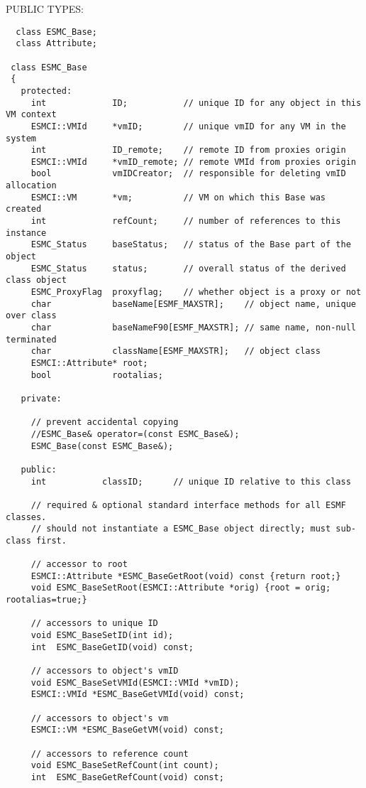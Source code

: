 \begin{verbatim} \end{verbatim}{\sf PUBLIC TYPES:}
\begin{verbatim}  class ESMC_Base;
  class Attribute;
 
 class ESMC_Base
 {
   protected:
     int             ID;           // unique ID for any object in this VM context
     ESMCI::VMId     *vmID;        // unique vmID for any VM in the system
     int             ID_remote;    // remote ID from proxies origin
     ESMCI::VMId     *vmID_remote; // remote VMId from proxies origin
     bool            vmIDCreator;  // responsible for deleting vmID allocation
     ESMCI::VM       *vm;          // VM on which this Base was created
     int             refCount;     // number of references to this instance
     ESMC_Status     baseStatus;   // status of the Base part of the object
     ESMC_Status     status;       // overall status of the derived class object
     ESMC_ProxyFlag  proxyflag;    // whether object is a proxy or not
     char            baseName[ESMF_MAXSTR];    // object name, unique over class 
     char            baseNameF90[ESMF_MAXSTR]; // same name, non-null terminated
     char            className[ESMF_MAXSTR];   // object class
     ESMCI::Attribute* root;
     bool            rootalias;
 
   private:
 
     // prevent accidental copying
     //ESMC_Base& operator=(const ESMC_Base&);
     ESMC_Base(const ESMC_Base&);
   
   public:
     int           classID;      // unique ID relative to this class
 
     // required & optional standard interface methods for all ESMF classes.
     // should not instantiate a ESMC_Base object directly; must sub-class first.
 
     // accessor to root
     ESMCI::Attribute *ESMC_BaseGetRoot(void) const {return root;}
     void ESMC_BaseSetRoot(ESMCI::Attribute *orig) {root = orig; rootalias=true;}
 
     // accessors to unique ID
     void ESMC_BaseSetID(int id);
     int  ESMC_BaseGetID(void) const;
 
     // accessors to object's vmID    
     void ESMC_BaseSetVMId(ESMCI::VMId *vmID);
     ESMCI::VMId *ESMC_BaseGetVMId(void) const;
     
     // accessors to object's vm
     ESMCI::VM *ESMC_BaseGetVM(void) const;
 
     // accessors to reference count
     void ESMC_BaseSetRefCount(int count);
     int  ESMC_BaseGetRefCount(void) const;
 

\end{verbatim}
